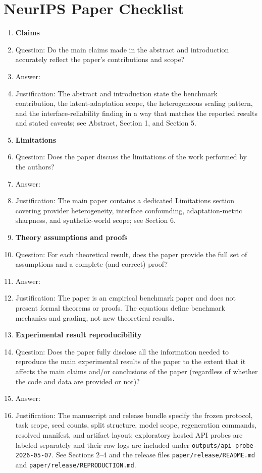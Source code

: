 \section*{NeurIPS Paper Checklist}

\begin{enumerate}

\item {\bf Claims}
    \item[] Question: Do the main claims made in the abstract and introduction accurately reflect the paper's contributions and scope?
    \item[] Answer: \answerYes{}
    \item[] Justification: The abstract and introduction state the benchmark contribution, the latent-adaptation scope, the heterogeneous scaling pattern, and the interface-reliability finding in a way that matches the reported results and stated caveats; see Abstract, Section 1, and Section 5.

\item {\bf Limitations}
    \item[] Question: Does the paper discuss the limitations of the work performed by the authors?
    \item[] Answer: \answerYes{}
    \item[] Justification: The main paper contains a dedicated Limitations section covering provider heterogeneity, interface confounding, adaptation-metric sharpness, and synthetic-world scope; see Section 6.

\item {\bf Theory assumptions and proofs}
    \item[] Question: For each theoretical result, does the paper provide the full set of assumptions and a complete (and correct) proof?
    \item[] Answer: \answerNA{}
    \item[] Justification: The paper is an empirical benchmark paper and does not present formal theorems or proofs. The equations define benchmark mechanics and grading, not new theoretical results.

\item {\bf Experimental result reproducibility}
    \item[] Question: Does the paper fully disclose all the information needed to reproduce the main experimental results of the paper to the extent that it affects the main claims and/or conclusions of the paper (regardless of whether the code and data are provided or not)?
    \item[] Answer: \answerYes{}
    \item[] Justification: The manuscript and release bundle specify the frozen protocol, task scope, seed counts, split structure, model scope, regeneration commands, resolved manifest, and artifact layout; exploratory hosted API probes are labeled separately and their raw logs are included under \texttt{outputs/api-probe-2026-05-07}. See Sections 2--4 and the release files \texttt{paper/release/README.md} and \texttt{paper/release/REPRODUCTION.md}.


\end{enumerate}
